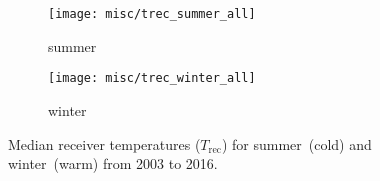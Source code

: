 \begin{figure}[ht]
    \centering
    \begin{subfigure}[b]{0.9545\textwidth}
        \texttt{[image: misc/trec\_summer\_all]}
        \caption{summer}\label{fig:01:trec:summer}
    \end{subfigure}
    \begin{subfigure}[b]{0.9545\textwidth}
        \texttt{[image: misc/trec\_winter\_all]}
        \caption{winter}\label{fig:01:trec:winter}
    \end{subfigure}
    \caption{Median receiver temperatures ($T_\mathrm{rec}$) for
        summer~(cold) and winter~(warm) from 2003 to 2016.
        }\label{fig:trec}
\end{figure}
